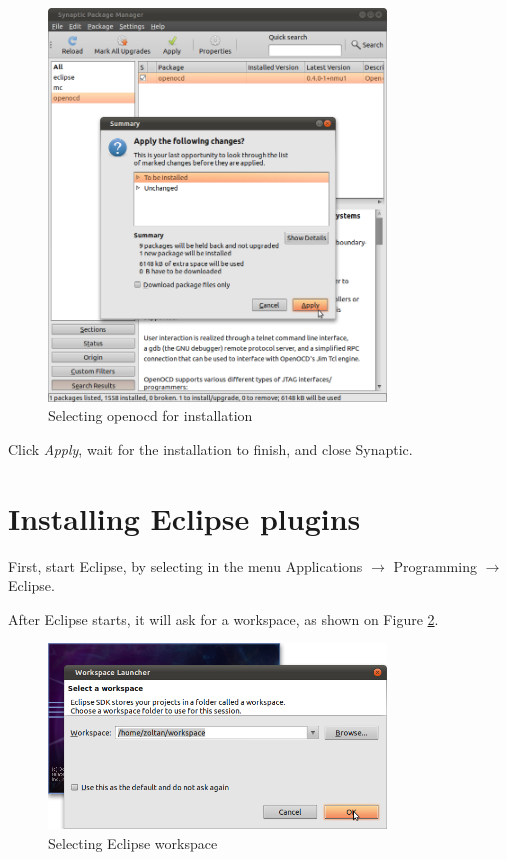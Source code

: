 \documentclass[a4paper, 10pt]{article}
\begin{document}
    \begin{figure}[H]
    \centering
        \includegraphics[width=0.8\textwidth]{./png-install-guide/synaptic-apply-changes.png}
        \caption{Selecting openocd for installation}
        \label{fig:synaptic-apply-changes.png}
    \end{figure}

Click \emph{Apply}, wait for the installation to finish, and close Synaptic.

\section{Installing Eclipse plugins}

First, start Eclipse, by selecting in the menu Applications $\rightarrow$
Programming $\rightarrow$ Eclipse.

After Eclipse starts, it will ask for a workspace, as shown on Figure \ref{fig:eclipse-workspace}.

    \begin{figure}[H]
    \centering
        \includegraphics[width=0.8\textwidth]{./png-install-guide/eclipse-workspace.png}
        \caption{Selecting Eclipse workspace}
        \label{fig:eclipse-workspace}
    \end{figure}
\end{document}
